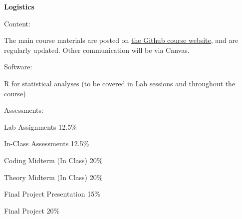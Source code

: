 \documentclass[11pt, aspectratio=169]{beamer}
\newenvironment{wideitemize}{\itemize\addtolength{\itemsep}{5pt}}{\enditemize}
\newenvironment{wideenumerate}{\enumerate\addtolength{\itemsep}{5pt}}{\endenumerate}
\begin{document}
\begin{frame}{\bf \large Logistics}
\begin{wideenumerate}
	\item Content: %
	
	\begin{wideitemize}
		\item The main course materials are posted on \href{https://adamsoliman.github.io/IntroEconometrics/}{the Github course website}, and are regularly updated. Other communication will be via Canvas.
	\end{wideitemize}

	\item Software:

\begin{wideitemize}
	\item R for statistical analyses (to be covered in Lab sessions and throughout the course)
\end{wideitemize}

\item Assessments:
\begin{wideitemize}
	\item Lab Assignments						12.5\%
	\item In-Class Assessments					12.5\%
	\item Coding Midterm (In Class)				20\%
	\item Theory Midterm (In Class)				20\%
	\item Final Project Presentation			15\%
	\item Final Project							20\%
\end{wideitemize}

\end{wideenumerate}
\end{frame}
\end{document}
